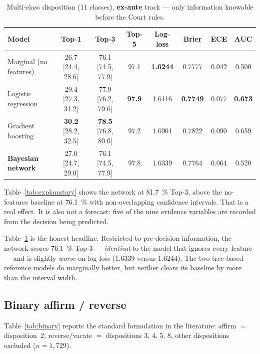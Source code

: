 \documentclass[11pt]{article}
\begin{document}
\begin{table}[t]
\centering
\caption{Multi-class disposition (11 classes), \textbf{ex-ante} track --- only
information knowable before the Court rules.}
\label{tab:exante}
\footnotesize
\setlength{\tabcolsep}{4pt}
\begin{tabular}{lccccccc}
\toprule
Model & Top-1 & Top-3 & Top-5 & Log-loss & Brier & ECE & AUC \\
\midrule
Marginal (no features) & 26.7 [24.4, 28.6] & 76.1 [74.5, 77.9] & 97.1 & \textbf{1.6244} & 0.7777 & 0.042 & 0.500 \\
Logistic regression    & 29.4 [27.3, 31.2] & 77.9 [76.2, 79.6] & \textbf{97.9} & 1.6116 & \textbf{0.7749} & 0.077 & \textbf{0.673} \\
Gradient boosting      & \textbf{30.2} [28.2, 32.5] & \textbf{78.5} [76.8, 80.0] & 97.2 & 1.6901 & 0.7822 & 0.090 & 0.659 \\
\textbf{Bayesian network} & 27.0 [24.7, 29.0] & 76.1 [74.5, 77.9] & 97.8 & 1.6339 & 0.7764 & 0.064 & 0.520 \\
\bottomrule
\end{tabular}
\end{table}

Table~\ref{tab:explanatory} shows the network at \SI{81.7}{\percent} Top-3,
above the no-features baseline at \SI{76.1}{\percent} with non-overlapping
confidence intervals. That is a real effect. It is also not a forecast: five of
the nine evidence variables are recorded from the decision being predicted.

Table~\ref{tab:exante} is the honest headline. Restricted to pre-decision
information, the network scores \SI{76.1}{\percent} Top-3 --- \emph{identical}
to the model that ignores every feature --- and is slightly \emph{worse} on
log-loss (1.6339 versus 1.6244). The two tree-based reference models do
marginally better, but neither clears its baseline by more than the interval
width.

\subsection{Binary affirm / reverse}

Table~\ref{tab:binary} reports the standard formulation in the literature:
affirm $=$ disposition~2, reverse/vacate $=$ dispositions 3, 4, 5, 8, other
dispositions excluded ($n = 1{,}729$).
\end{document}
